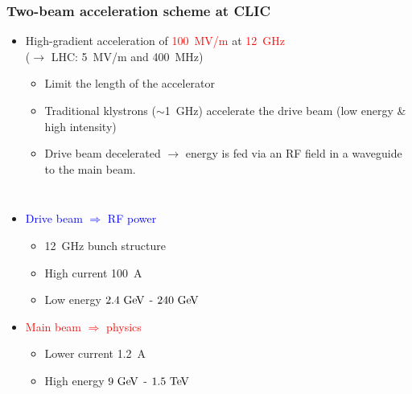 {
  \begin{frame}
    \frametitle{Two-beam acceleration scheme at CLIC}
    
    \vspace{-1.8cm}
    \begin{itemize}
    \item High-gradient acceleration of \textcolor{Red}{100~MV/m} at
      \textcolor{Red}{12~GHz} \\
      ($\rightarrow$ LHC: 5~MV/m and 400~MHz)
      \begin{itemize}
      \item Limit the length of the accelerator
      \item Traditional klystrons ($\sim$1~GHz) accelerate the drive
        beam (low energy \& high intensity)
      \item Drive beam decelerated $\rightarrow$ energy is fed via an
        RF field in a waveguide to the main beam.
      \end{itemize}
    \end{itemize}
    
    \begin{columns}
      \begin{itemize}
      \item \textcolor{blue}{Drive beam $\Rightarrow$ RF power}
        \begin{itemize}
        \item 12~GHz bunch structure
        \item High current 100~A
        \item Low energy $2.4\,\mathrm{\,Ge\kern -0.1em V}$ - $240\,\mathrm{\,Ge\kern -0.1em V}$
        \end{itemize}
      \item \textcolor{red}{Main beam $\Rightarrow$ physics}
        \begin{itemize}
        \item Lower current 1.2~A
        \item High energy $9\,\mathrm{\,Ge\kern -0.1em V}$ - $1.5\,\mathrm{\,Te\kern -0.1em V}$
        \end{itemize}
      \end{itemize}
    \end{columns}

  \end{frame}
}

